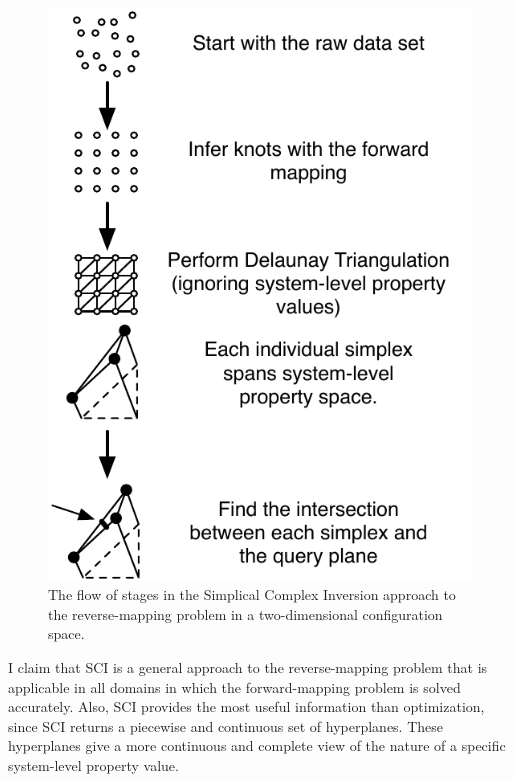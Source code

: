 \begin{figure}[ht]
\centering
\includegraphics[scale=1]{images/ISflow.pdf}
\caption{The flow of stages in the Simplical Complex Inversion approach to the reverse-mapping problem in a two-dimensional configuration space.}
\label{fig:ISFlow}
\end{figure}

I claim that SCI is a general approach to the reverse-mapping problem that is applicable in all domains in which the forward-mapping problem is solved accurately.
Also, SCI provides the most useful information than optimization, since SCI returns a piecewise and continuous set of hyperplanes.
These hyperplanes give a more continuous and complete view of the nature of a specific system-level property value.




